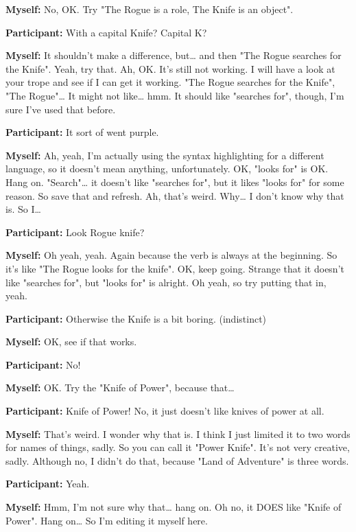 \documentclass[11pt]{report}
\begin{document}
\begin{linenumbers}
\textbf{Myself:} No, OK. Try "The Rogue is a role, The Knife is an object".

\textbf{Participant:} With a capital Knife? Capital K?

\textbf{Myself:} It shouldn't make a difference, but\ldots{} and then "The Rogue searches for the Knife". Yeah, try that. Ah, OK. It's still not working. I will have a look at your trope and see if I can get it working. "The Rogue searches for the Knife", "The Rogue"\ldots{} It might not like\ldots{} hmm. It should like "searches for", though, I'm sure I've used that before.

\textbf{Participant:} It sort of went purple.

\textbf{Myself:} Ah, yeah, I'm actually using the syntax highlighting for a different language, so it doesn't mean anything, unfortunately. OK, "looks for" is OK. Hang on. "Search"\ldots{} it doesn't like "searches for", but it likes "looks for" for some reason. So save that and refresh. Ah, that's weird. Why\ldots{} I don't know why that is. So I\ldots{}

\textbf{Participant:} Look Rogue knife?

\textbf{Myself:} Oh yeah, yeah. Again because the verb is always at the beginning. So it's like "The Rogue looks for the knife". OK, keep going. Strange that it doesn't like "searches for", but "looks for" is alright. Oh yeah, so try putting that in, yeah.

\textbf{Participant:} Otherwise the Knife is a bit boring. (indistinct)

\textbf{Myself:} OK, see if that works.

\textbf{Participant:} No!

\textbf{Myself:} OK. Try the "Knife of Power", because that\ldots{}

\textbf{Participant:} Knife of Power! No, it just doesn't like knives of power at all.

\textbf{Myself:} That's weird. I wonder why that is. I think I just limited it to two words for names of things, sadly. So you can call it "Power Knife". It's not very creative, sadly. Although no, I didn't do that, because "Land of Adventure" is three words.

\textbf{Participant:} Yeah.

\textbf{Myself:} Hmm, I'm not sure why that\ldots{} hang on. Oh no, it DOES like "Knife of Power". Hang on\ldots{} So I'm editing it myself here.


\end{linenumbers}
\end{document}
